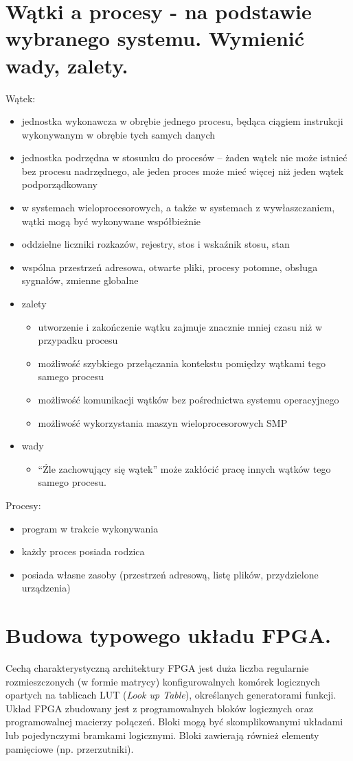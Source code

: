 \documentclass[12pt,a4paper]{article}
\begin{document}
	\section{Wątki a procesy - na podstawie wybranego systemu. Wymienić wady, zalety.}
	Wątek:
	\begin{itemize}
		\item jednostka wykonawcza w obrębie jednego procesu, będąca ciągiem instrukcji wykonywanym w obrębie tych samych danych
		\item jednostka podrzędna w stosunku do procesów – żaden wątek nie może istnieć bez procesu nadrzędnego, ale jeden proces może mieć więcej niż jeden wątek podporządkowany
		\item w systemach wieloprocesorowych, a także w systemach z wywłaszczaniem, wątki mogą być wykonywane współbieżnie
		\item oddzielne liczniki rozkazów, rejestry, stos i wskaźnik stosu, stan
		\item wspólna przestrzeń adresowa, otwarte pliki, procesy potomne, obsługa sygnałów, zmienne globalne
		\item zalety
		\begin{itemize}
			\item utworzenie i zakończenie wątku zajmuje znacznie mniej czasu niż w przypadku procesu
			\item możliwość szybkiego przełączania kontekstu pomiędzy wątkami tego samego procesu
			\item możliwość komunikacji wątków bez pośrednictwa systemu operacyjnego
			\item możliwość wykorzystania maszyn wieloprocesorowych SMP
		\end{itemize}
		\item wady
		\begin{itemize}
			\item “Źle zachowujący się wątek” może zakłócić pracę innych wątków tego samego procesu.
		\end{itemize}
	\end{itemize}
	
	Procesy:
	\begin{itemize}
		\item program w trakcie wykonywania
		\item każdy proces posiada rodzica
		\item posiada własne zasoby (przestrzeń adresową, listę plików, przydzielone urządzenia)
	\end{itemize}

	\section{Budowa typowego układu FPGA.}
	Cechą charakterystyczną architektury FPGA jest duża liczba regularnie rozmieszczonych (w formie matrycy) konfigurowalnych komórek logicznych opartych na tablicach LUT (\textit{Look up Table}), określanych generatorami funkcji. Układ FPGA zbudowany jest z programowalnych bloków logicznych oraz programowalnej macierzy połączeń. Bloki mogą być skomplikowanymi układami lub pojedynczymi bramkami logicznymi. Bloki zawierają również elementy pamięciowe (np. przerzutniki).
\end{document}

